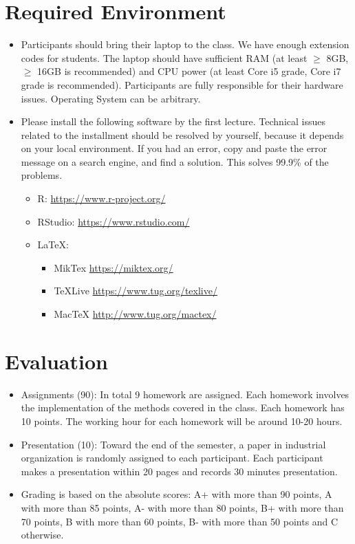 \documentclass[
]{book}
\providecommand{\tightlist}{%
  \setlength{\itemsep}{0pt}\setlength{\parskip}{0pt}}
\begin{document}
\hypertarget{required-environment}{%
\section{Required Environment}\label{required-environment}}

\begin{itemize}
\tightlist
\item
  Participants should bring their laptop to the class. We have enough extension codes for students. The laptop should have sufficient RAM (at least \(\ge\) 8GB, \(\ge\) 16GB is recommended) and CPU power (at least Core i5 grade, Core i7 grade is recommended). Participants are fully responsible for their hardware issues. Operating System can be arbitrary.
\item
  Please install the following software by the first lecture. Technical issues related to the installment should be resolved by yourself, because it depends on your local environment. If you had an error, copy and paste the error message on a search engine, and find a solution. This solves 99.9\% of the problems.

  \begin{itemize}
  \tightlist
  \item
    R: \url{https://www.r-project.org/}
  \item
    RStudio: \url{https://www.rstudio.com/}
  \item
    LaTeX:

    \begin{itemize}
    \tightlist
    \item
      MikTex \url{https://miktex.org/}
    \item
      TeXLive \url{https://www.tug.org/texlive/}
    \item
      MacTeX \url{http://www.tug.org/mactex/}
    \end{itemize}
  \end{itemize}
\end{itemize}

\hypertarget{evaluation}{%
\section{Evaluation}\label{evaluation}}

\begin{itemize}
\tightlist
\item
  Assignments (90): In total 9 homework are assigned. Each homework involves the implementation of the methods covered in the class. Each homework has 10 points. The working hour for each homework will be around 10-20 hours.
\item
  Presentation (10): Toward the end of the semester, a paper in industrial organization is randomly assigned to each participant. Each participant makes a presentation within 20 pages and records 30 minutes presentation.
\item
  Grading is based on the absolute scores: A+ with more than 90 points, A with more than 85 points, A- with more than 80 points, B+ with more than 70 points, B with more than 60 points, B- with more than 50 points and C otherwise.
\end{itemize}
\end{document}
